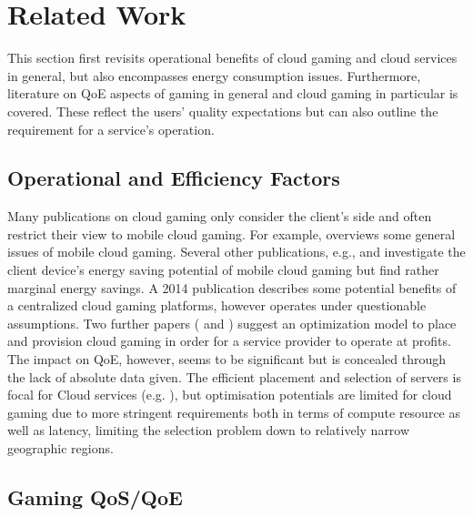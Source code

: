 \section{Related Work}
\label{sec:relatedwork}

This section first revisits operational benefits of cloud gaming and cloud services in general, but also encompasses energy consumption issues.  Furthermore, literature on \gls{QoE} aspects of gaming in general and cloud gaming in particular is covered. These reflect the users' quality expectations but can also outline the requirement for a service's operation.


\subsection{Operational and Efficiency Factors}

Many publications on cloud gaming only consider the client's side and often restrict their view to mobile cloud gaming. For example, \cite{Soliman2013} overviews some general issues of mobile cloud gaming. Several other publications, e.g., \cite{6924295} and \cite{Huang:2014:MCP:2755535.2755542} investigate the client device's energy saving potential of mobile cloud gaming but find rather marginal energy savings. A 2014 publication \cite{6882299} describes some potential benefits of a centralized cloud gaming platforms, however operates under questionable assumptions. Two further papers (\cite{6853364} and \cite{6365107}) suggest an optimization model to place and provision cloud gaming  in order for a service provider to operate at profits. The impact on \gls{QoE}, however, seems to be significant but is concealed through the lack of absolute data given. The efficient placement and selection of servers is focal for Cloud services (e.g. \cite{6740249}), but optimisation potentials are limited for cloud gaming due to more stringent requirements both in terms of compute resource as well as latency, limiting the selection problem down to relatively narrow geographic regions.


\subsection{Gaming QoS/QoE}

